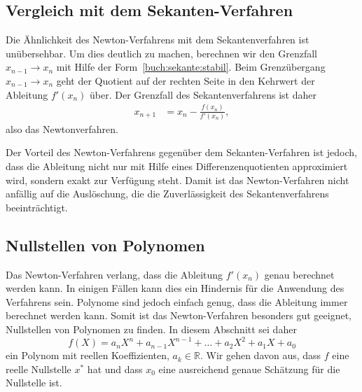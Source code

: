 %
%
\subsection{Vergleich mit dem Sekanten-Verfahren
\label{buch:subsection:newtonsekanten}}
Die Ähnlichkeit des Newton-Verfahrens mit dem Sekantenverfahren ist 
unübersehbar.
Um dies deutlich zu machen, berechnen wir den Grenzfall $x_{n-1}\to x_n$
mit Hilfe der Form~\eqref{buch:sekante:stabil}.
Beim Grenzübergang $x_{n-1}\to x_n$ geht der Quotient auf der rechten
Seite in den Kehrwert der Ableitung $f'(x_n)$ über.
Der Grenzfall des Sekantenverfahrens ist daher
\begin{align*}
x_{n+1}
&=
x_n -\frac{f(x_n)}{f'(x_n)},
\end{align*}
also das Newtonverfahren.

Der Vorteil des Newton-Verfahrens gegenüber dem Sekanten-Verfahren ist
jedoch, dass die Ableitung nicht nur mit Hilfe eines Differenzenquotienten
approximiert wird, sondern exakt zur Verfügung steht.
Damit ist das Newton-Verfahren nicht anfällig auf die Auslöschung, die
die Zuverlässigkeit des Sekantenverfahrens beeinträchtigt.

%
%
\subsection{Nullstellen von Polynomen
\label{buch:subsection:polynomnullstellen}}
Das Newton-Verfahren verlang, dass die Ableitung $f'(x_n)$ genau
berechnet werden kann.
In einigen Fällen kann dies ein Hindernis für die Anwendung des
Verfahrens sein.
Polynome sind jedoch einfach genug, dass die Ableitung immer berechnet
werden kann.
Somit ist das Newton-Verfahren besonders gut geeignet, Nullstellen von
Polynomen zu finden.
In diesem Abschnitt sei daher
\begin{equation}
f(X) = a_nX^n + a_{n-1}X^{n-1} + \dots + a_2X^2 + a_1X + a_0
\label{buch:equation:nullstellenpolynom}
\end{equation}
ein Polynom mit reellen Koeffizienten, $a_k\in\mathbb R$.
Wir gehen davon aus, dass $f$ eine reelle Nullstelle $x^*$ hat
und dass $x_0$ eine ausreichend genaue Schätzung für die Nullstelle ist.

